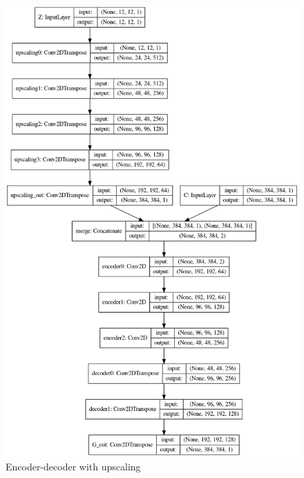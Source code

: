 \documentclass{article}
\begin{document}
		\begin{figure}
			\centering
			\includegraphics[scale=0.4]{upscaling_encoder_decoder.png}
			\caption{Encoder-decoder with upscaling}
		\end{figure}
	
\end{document}
